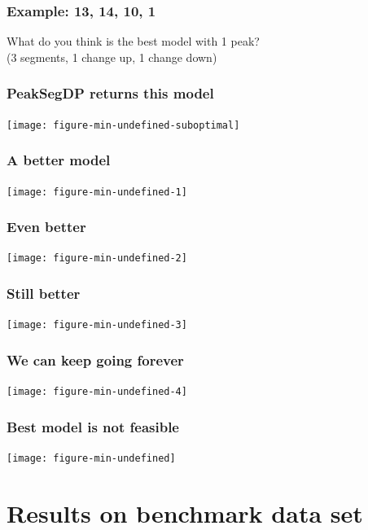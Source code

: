 \documentclass{beamer}
\begin{document}
\begin{frame}
  \frametitle{Example: 13, 14, 10, 1}
  What do you think is the best model with 1 peak?\\
  (3 segments, 1 change up, 1 change down)
\end{frame}

\begin{frame}
  \frametitle{PeakSegDP returns this model}
  \texttt{[image: figure-min-undefined-suboptimal]}
\end{frame}

\begin{frame}
  \frametitle{A better model}
  \texttt{[image: figure-min-undefined-1]}
\end{frame}

\begin{frame}
  \frametitle{Even better}
  \texttt{[image: figure-min-undefined-2]}
\end{frame}

\begin{frame}
  \frametitle{Still better}
  \texttt{[image: figure-min-undefined-3]}
\end{frame}

\begin{frame}
  \frametitle{We can keep going forever}
  \texttt{[image: figure-min-undefined-4]}
\end{frame}

\begin{frame}
  \frametitle{Best model is not feasible}
  \texttt{[image: figure-min-undefined]}
\end{frame}

\section{Results on benchmark data set}
\end{document}
